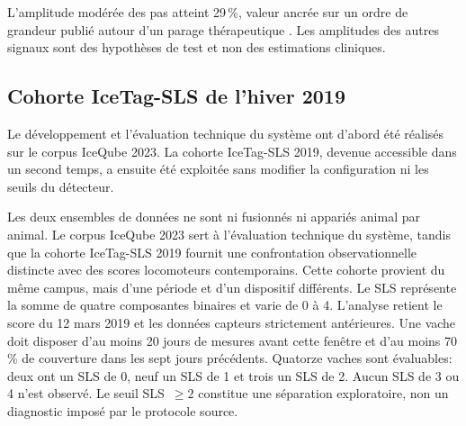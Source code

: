 L'amplitude modérée des pas atteint 29\,\%, valeur ancrée sur un ordre de grandeur publié
autour d'un parage thérapeutique \citep{paudyal2021lying}. Les amplitudes des autres signaux
sont des hypothèses de test et non des estimations cliniques.

\subsection{Cohorte IceTag-SLS de l'hiver 2019}
\label{subsec:corpus_mcgill}

Le développement et l'évaluation technique du système ont d'abord été réalisés sur le corpus
IceQube 2023. La cohorte IceTag-SLS 2019, devenue accessible dans un second temps, a ensuite
été exploitée sans modifier la configuration ni les seuils du détecteur.

Les deux ensembles de données ne sont ni fusionnés ni appariés animal par animal. Le corpus
IceQube 2023 sert à l'évaluation technique du système, tandis que la cohorte IceTag-SLS 2019
fournit une confrontation observationnelle distincte avec des scores locomoteurs contemporains.
Cette cohorte provient du même campus, mais d'une période et d'un dispositif différents.
Le SLS représente la somme de quatre composantes binaires et varie de 0 à 4. L'analyse retient le
score du 12 mars 2019 et les données capteurs strictement antérieures. Une vache doit disposer
d'au moins 20 jours de mesures avant cette fenêtre et d'au moins 70\,\% de couverture dans les
sept jours précédents.
Quatorze vaches sont évaluables: deux ont un SLS de 0, neuf un SLS de 1 et trois un SLS de 2.
Aucun SLS de 3 ou 4 n'est observé. Le seuil SLS~$\geq2$ constitue une séparation
exploratoire, non un diagnostic imposé par le protocole source.

